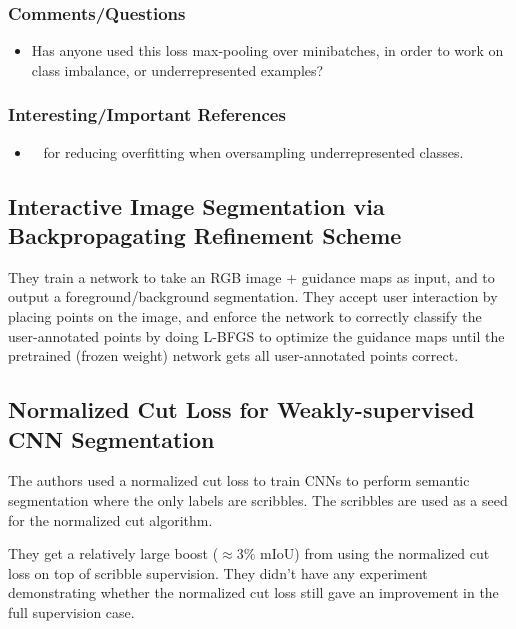 \documentclass[a4paper, 12pt]{article}
\begin{document}
\subsubsection{Comments/Questions}

\begin{itemize}
        \item Has anyone used this loss max-pooling over minibatches, in order
                to work on class imbalance, or underrepresented examples?
\end{itemize}


\subsubsection{Interesting/Important References}

\begin{itemize}
        \item~\cite{bunkhumpornpat2009safe} for reducing overfitting when
                oversampling underrepresented classes.
\end{itemize}


\subsection{Interactive Image Segmentation via Backpropagating Reﬁnement
            Scheme~\cite{jang2019interactive}}

They train a network to take an RGB image + guidance maps as input, and to
output a foreground/background segmentation. They accept user interaction by
placing points on the image, and enforce the network to correctly classify the
user-annotated points by doing L-BFGS to optimize the guidance maps until the
pretrained (frozen weight) network gets all user-annotated points correct.


\subsection{Normalized Cut Loss for Weakly-supervised CNN
            Segmentation~\cite{tang2018normalized}}

The authors used a normalized cut loss to train CNNs to perform semantic
segmentation where the only labels are scribbles. The scribbles are used as a
seed for the normalized cut algorithm.

They get a relatively large boost ($\approx 3\%$ mIoU) from using the
normalized cut loss on top of scribble supervision. They didn't have any
experiment demonstrating whether the normalized cut loss still gave an
improvement in the full supervision case.
\end{document}
